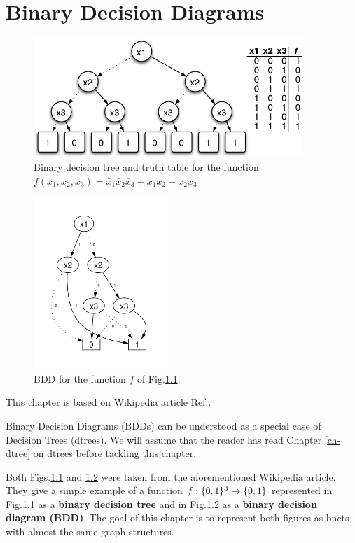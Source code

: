 \chapter{Binary Decision Diagrams}
\begin{figure}[h!]
\centering
\includegraphics[width=4in]{binarydd/bdd-tree.png}
\caption{Binary decision tree and truth table 
for the function $
f(x_{1},
x_{2},x_{3})={\bar  {x}}_{1}{\bar 
 {x}}_{2}{\bar  {x}}_{3}+
x_{1}x_{2}+x_{2}x_{3} $ }
\label{fig-bdd-tree}
\end{figure}

\begin{figure}[h!]
\centering
\includegraphics[width=2in]{binarydd/bdd.png}
\caption{BDD for the function $f$
of Fig.\ref{fig-bdd-tree}.} 
\label{fig-bdd}
\end{figure}

This chapter is based
on Wikipedia article Ref.\cite{wiki-bdd}.

Binary Decision Diagrams (BDDs)
can be understood as a special
case of Decision Trees (dtrees).
We will
assume
that the reader has read
Chapter \ref{ch-dtree} 
on dtrees before
tackling this chapter.

Both Figs.\ref{fig-bdd-tree}
and \ref{fig-bdd} were taken
from the aforementioned Wikipedia article. They
give a simple example of a function
$f:\{0,1\}^3\rightarrow\{0,1\}$
represented in
Fig.\ref{fig-bdd-tree} as a
{\bf binary decision tree}
 and in Fig.\ref{fig-bdd} as a {\bf binary
decision diagram (BDD)}.
The goal 
of this chapter is
to represent both
figures as bnets with
almost the same graph structures.

